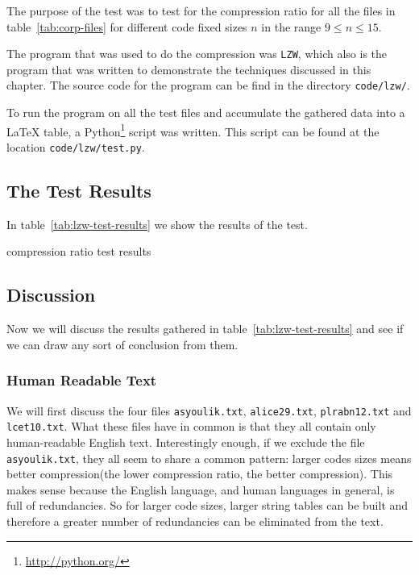 The purpose of the test was to test for the compression ratio for all
the files in table~\ref{tab:corp-files} for different code fixed sizes
$n$ in the range $9 \leq n \leq 15$.

The program that was used to do the compression was \verb|LZW|, which
also is the program that was written to demonstrate the techniques
discussed in this chapter. The source code for the program can be find
in the directory \verb|code/lzw/|.

To run the program on all the test files and accumulate the gathered
data into a \LaTeX{} table, a
Python\footnote{\url{http://python.org/}} script was written. This
script can be found at the location \verb|code/lzw/test.py|.

\subsection{The Test Results}

In table~\ref{tab:lzw-test-results} we show the results of the test.

\begin{sidewaystable}
    \small
    \centering
    
    \caption{\lzw compression ratio test results}
    \label{tab:lzw-test-results}
\end{sidewaystable}
\subsection{Discussion}

Now we will discuss the results gathered in
table~\ref{tab:lzw-test-results} and see if we can draw any sort of
conclusion from them.

\subsubsection{Human Readable Text}

We will first discuss the four files \verb|asyoulik.txt|,
\verb|alice29.txt|, \verb|plrabn12.txt| and \verb|lcet10.txt|. What
these files have in common is that they all contain only
human-readable English text. Interestingly enough, if we exclude the
file \verb|asyoulik.txt|, they all seem to share a common pattern:
larger codes sizes means better compression(the lower compression
ratio, the better compression). This makes sense because the English
language, and human languages in general, is full of redundancies. So
for larger code sizes, larger string tables can be built and therefore
a greater number of redundancies can be eliminated from the text.

